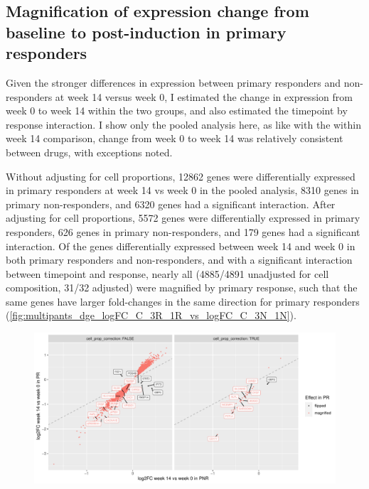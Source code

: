 \begin{outline}
\subsection{Magnification of expression change from baseline to post-induction in primary responders}

Given the stronger differences in expression between primary responders and non-responders at week 14 versus week 0,
I estimated the change in expression from week 0 to week 14 within the two groups, and also estimated the timepoint by response interaction.
I show only the pooled analysis here, as like with the within week 14 comparison, change from week 0 to week 14 was relatively consistent between drugs, with exceptions noted.

Without adjusting for cell proportions,
12862 genes were differentially expressed in primary responders at week 14 vs week 0 in the pooled analysis,
8310 genes in primary non-responders,
and 6320 genes had a significant interaction.
After adjusting for cell proportions, 
5572 genes were differentially expressed in primary responders,
626 genes in primary non-responders,
and 179 genes had a significant interaction.
Of the genes differentially expressed between week 14 and week 0 in both primary responders and non-responders,
and with a significant interaction between timepoint and response, 
nearly all (4885/4891 unadjusted for cell composition, 31/32 adjusted) were magnified by primary response,
such that the same genes have larger fold-changes in the same direction for primary responders (\autoref{fig:multipants_dge_logFC_C_3R_1R_vs_logFC_C_3N_1N}).

\begin{figure}
    \centering
    \includegraphics[width=1.0\textwidth,page=1]{mainmatter/figures/chapter_04/plot_gene_set_enrichment.logFC_C_3R_1R_vs_logFC_C_3N_1N.pdf}
    \caption{}
    \label{fig:multipants_dge_logFC_C_3R_1R_vs_logFC_C_3N_1N}
\end{figure}


\end{outline}
